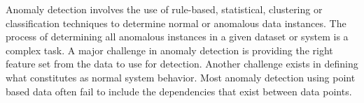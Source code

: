 Anomaly detection involves the use of rule-based, statistical, clustering or classification techniques to determine normal or anomalous data instances. The process of determining all anomalous instances in a given dataset or system is a complex task. A major challenge in anomaly detection is providing the right feature set from the data to use for detection. Another challenge exists in defining what constitutes as normal system behavior. Most anomaly detection using point based data often fail to include the dependencies that exist between data points. 








%
%
%
%
%
%
